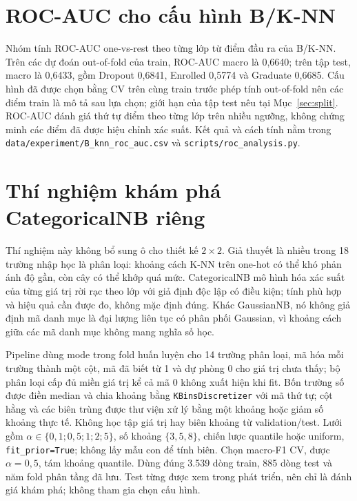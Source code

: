 \section{ROC-AUC cho cấu hình B/K-NN}
Nhóm tính ROC-AUC one-vs-rest theo từng lớp từ điểm đầu ra của B/K-NN. Trên các dự đoán out-of-fold của train, ROC-AUC macro là 0,6640; trên tập test, macro là 0,6433, gồm Dropout 0,6841, Enrolled 0,5774 và Graduate 0,6685. Cấu hình đã được chọn bằng CV trên cùng train trước phép tính out-of-fold nên các điểm train là mô tả sau lựa chọn; giới hạn của tập test nêu tại Mục~\ref{sec:split}. ROC-AUC đánh giá thứ tự điểm theo từng lớp trên nhiều ngưỡng, không chứng minh các điểm đã được hiệu chỉnh xác suất. Kết quả và cách tính nằm trong \texttt{data/experiment/B\_knn\_roc\_auc.csv} và \texttt{scripts/roc\_analysis.py}.

\section{Thí nghiệm khám phá CategoricalNB riêng}\label{sec:categorical-nb}
Thí nghiệm này không bổ sung ô cho thiết kế $2\times2$. Giả thuyết là nhiều trong 18 trường nhập học là phân loại: khoảng cách K-NN trên one-hot có thể khó phản ánh độ gần, còn cây có thể khớp quá mức. CategoricalNB mô hình hóa xác suất của từng giá trị rời rạc theo lớp với giả định độc lập có điều kiện; tính phù hợp và hiệu quả cần được đo, không mặc định đúng. Khác GaussianNB, nó không giả định mã danh mục là đại lượng liên tục có phân phối Gaussian, vì khoảng cách giữa các mã danh mục không mang nghĩa số học.

Pipeline dùng mode trong fold huấn luyện cho 14 trường phân loại, mã hóa mỗi trường thành một cột, mã đã biết từ 1 và dự phòng 0 cho giá trị chưa thấy; bộ phân loại cấp đủ miền giá trị kể cả mã 0 không xuất hiện khi fit. Bốn trường số được điền median và chia khoảng bằng \texttt{KBinsDiscretizer} với mã thứ tự; cột hằng và các biên trùng được thư viện xử lý bằng một khoảng hoặc giảm số khoảng thực tế. Không học tập giá trị hay biên khoảng từ validation/test. Lưới gồm $\alpha\in\{0{,}1;0{,}5;1;2;5\}$, số khoảng $\{3,5,8\}$, chiến lược quantile hoặc uniform, \texttt{fit\_prior=True}; không lấy mẫu con để tính biên. Chọn macro-F1 CV, được $\alpha=0{,}5$, tám khoảng quantile. Dùng đúng 3.539 dòng train, 885 dòng test và năm fold phân tầng đã lưu. Test từng được xem trong phát triển, nên chỉ là đánh giá khám phá; không tham gia chọn cấu hình.

